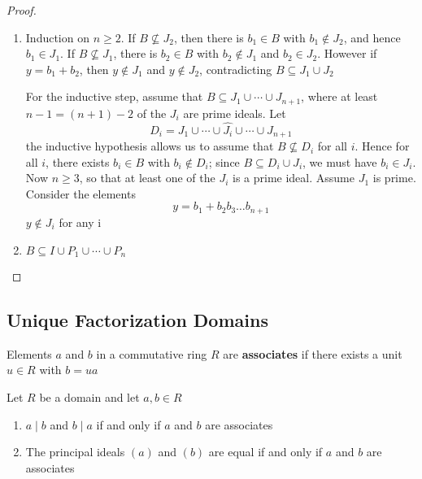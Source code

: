 \documentclass[11pt]{article}
\begin{document}
\begin{proof}
\begin{enumerate}
\item Induction on \(n\ge2\). If \(B\not\subseteq J_2\), then there is \(b_1\in B\)
with \(b_1\not\in J_2\), and hence \(b_1\in J_1\). If \(B\not\subseteq J_1\),
there is \(b_2\in B\) with \(b_2\not\in J_1\) and \(b_2\in J_2\). However if
\(y=b_1+b_2\), then \(y\not\in J_1\) and \(y\not\in J_2\), contradicting 
\(B\subseteq J_1\cup J_2\)

For the inductive step, assume that \(B\subseteq J_1\cup\cdots\cup J_{n+1}\),
where at least \(n-1=(n+1)-2\) of the \(J_i\) are prime ideals. Let
\begin{equation*}
D_i=J_1\cup\cdots\cup\widehat{J_i}\cup\cdots\cup J_{n+1}
\end{equation*}
the inductive hypothesis allows us to assume that \(B\not\subseteq D_i\) for
all \(i\). Hence for all \(i\), there exists \(b_i\in B\) with 
\(b_i\not\in D_i\); since \(B\subseteq D_i\cup J_i\), we must have 
\(b_i\in J_i\). Now \(n\ge3\), so that at least one of the \(J_i\) is a prime
ideal. Assume \(J_1\) is prime. Consider the elements
\begin{equation*}
y=b_1+b_2b_3\dots b_{n+1}
\end{equation*}
\(y\not\in J_i\) for any i
\item \(B\subseteq I\cup P_1\cup\cdots\cup P_n\)
\end{enumerate}
\end{proof}
\subsection{Unique Factorization Domains}
\label{sec:org8e3d27c}
\begin{definition}[]
Elements \(a\) and \(b\) in a commutative ring \(R\) are \textbf{associates} if there exists
a unit \(u\in R\) with \(b=ua\)
\end{definition}

\begin{proposition}[]
Let \(R\) be a domain and let \(a,b\in R\)
\begin{enumerate}
\item \(a\mid b\) and \(b\mid a\) if and only if \(a\) and \(b\) are associates
\item The principal ideals \((a)\)  and \((b)\) are equal if and only if \(a\)
and \(b\) are associates
\end{enumerate}
\end{proposition}
\end{document}
